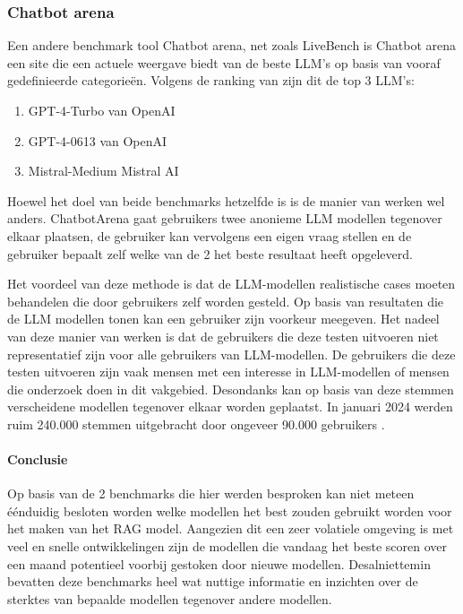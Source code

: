     \subsubsection{Chatbot arena} 
    
    Een andere benchmark tool Chatbot arena, net zoals LiveBench is Chatbot arena een site die een actuele weergave biedt van de beste LLM's op basis van vooraf gedefinieerde categorieën. 
    Volgens de ranking van \textcite{LiveBench2025} zijn dit de top 3 LLM's:
    
    \begin{enumerate}
        \item GPT-4-Turbo van OpenAI
        \item GPT-4-0613 van OpenAI
        \item Mistral-Medium Mistral AI
    \end{enumerate}
    
    Hoewel het doel van beide benchmarks hetzelfde is is de manier van werken wel anders. ChatbotArena gaat gebruikers twee anonieme LLM modellen tegenover elkaar plaatsen, de gebruiker kan vervolgens een eigen vraag stellen en de gebruiker bepaalt zelf welke van de 2 het beste resultaat heeft opgeleverd.
    
    Het voordeel van deze methode is dat de LLM-modellen realistische cases moeten behandelen die door gebruikers zelf worden gesteld. Op basis van resultaten die de LLM modellen tonen kan een gebruiker zijn voorkeur meegeven. Het nadeel van deze manier van werken is dat de gebruikers die deze testen uitvoeren niet representatief zijn voor alle gebruikers van LLM-modellen. De gebruikers die deze testen uitvoeren zijn vaak mensen met een interesse in LLM-modellen of mensen die onderzoek doen in dit vakgebied. Desondanks kan op basis van deze stemmen verscheidene modellen tegenover elkaar worden geplaatst. In januari 2024 werden ruim 240.000 stemmen uitgebracht door ongeveer 90.000 gebruikers \autocite{Chiang2024}. 
    
    \paragraph{Conclusie}
    
    Op basis van de 2 benchmarks die hier werden besproken kan niet meteen éénduidig besloten worden welke modellen het best zouden gebruikt worden voor het maken van het RAG model. Aangezien dit een zeer volatiele omgeving is met veel en snelle ontwikkelingen zijn de modellen die vandaag het beste scoren over een maand potentieel voorbij gestoken door nieuwe modellen. Desalniettemin bevatten deze benchmarks heel wat nuttige informatie en inzichten over de sterktes van bepaalde modellen tegenover andere modellen. 
    
